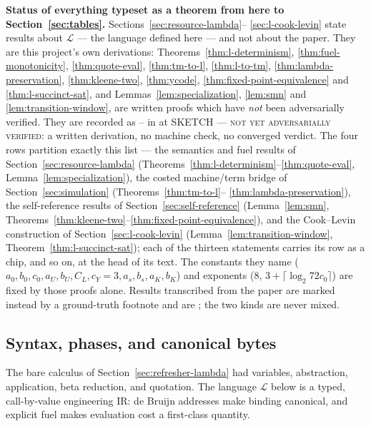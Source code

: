 \begin{reminder}
\textbf{Status of everything typeset as a theorem from here to
Section~\ref{sec:tables}.}  Sections~\ref{sec:resource-lambda}--%
\ref{sec:l-cook-levin} state results about \(\mathcal L\) --- the language
defined here --- and not about the paper.  They are this project's own
derivations: Theorems~\ref{thm:l-determinism}, \ref{thm:fuel-monotonicity},
\ref{thm:quote-eval}, \ref{thm:tm-to-l}, \ref{thm:l-to-tm},
\ref{thm:lambda-preservation}, \ref{thm:kleene-two}, \ref{thm:ycode},
\ref{thm:fixed-point-equivalence} and \ref{thm:l-succinct-sat}, and
Lemmas~\ref{lem:specialization}, \ref{lem:smn} and
\ref{lem:transition-window}, are written proofs which have \emph{not} been
adversarially verified.  They are recorded as -- in
 at \textsc{SKETCH --- not yet adversarially
verified}: a written derivation, no machine check, no converged verdict.  The
four rows partition exactly this list ---  the semantics and fuel
results of Section~\ref{sec:resource-lambda}
(Theorems~\ref{thm:l-determinism}--\ref{thm:quote-eval},
Lemma~\ref{lem:specialization}),  the costed machine/term bridge of
Section~\ref{sec:simulation} (Theorems~\ref{thm:tm-to-l}--%
\ref{thm:lambda-preservation}),  the self-reference results of
Section~\ref{sec:self-reference} (Lemma~\ref{lem:smn},
Theorems~\ref{thm:kleene-two}--\ref{thm:fixed-point-equivalence}), and
 the Cook--Levin construction of
Section~\ref{sec:l-cook-levin} (Lemma~\ref{lem:transition-window},
Theorem~\ref{thm:l-succinct-sat}); each of the thirteen statements carries
its row as a chip,  and so on, at the head of its
text.  The
constants they name (\(a_0,b_0,c_0,a_U,b_U,C_L,c_Y=3,a_s,b_s,a_K,b_K\)) and
exponents (\(8\), \(3+\lceil\log_2 72c_0\rceil\)) are fixed by those proofs
alone.  Results transcribed from the paper are marked instead by a
ground-truth footnote and are ; the two kinds are never mixed.
\end{reminder}

\subsection{Syntax, phases, and canonical bytes}

\begin{reminder}
The bare calculus of Section~\ref{sec:refresher-lambda} had variables,
abstraction, application, beta reduction, and quotation.  The language
\(\mathcal L\) below is a typed, call-by-value engineering IR: de Bruijn
addresses make binding canonical, and explicit fuel makes evaluation cost a
first-class quantity.
\end{reminder}

